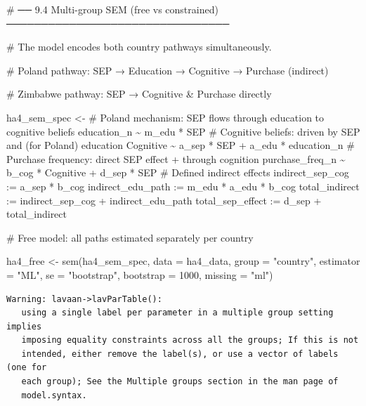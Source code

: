 \documentclass[
  letterpaper,
  DIV=11,
  numbers=noendperiod]{scrartcl}
\newenvironment{Shaded}{\begin{snugshade}}{\end{snugshade}}
\newcommand{\AttributeTok}[1]{\textcolor[rgb]{0.40,0.45,0.13}{#1}}
\newcommand{\CommentTok}[1]{\textcolor[rgb]{0.37,0.37,0.37}{#1}}
\newcommand{\DecValTok}[1]{\textcolor[rgb]{0.68,0.00,0.00}{#1}}
\newcommand{\FunctionTok}[1]{\textcolor[rgb]{0.28,0.35,0.67}{#1}}
\newcommand{\NormalTok}[1]{\textcolor[rgb]{0.00,0.23,0.31}{#1}}
\newcommand{\OtherTok}[1]{\textcolor[rgb]{0.00,0.23,0.31}{#1}}
\newcommand{\StringTok}[1]{\textcolor[rgb]{0.13,0.47,0.30}{#1}}
\begin{document}
\begin{Shaded}
\begin{Highlighting}[]
\CommentTok{\# ── 9.4  Multi{-}group SEM (free vs constrained) ────────────────────────────────}

\CommentTok{\# The model encodes both country pathways simultaneously.}

\CommentTok{\# Poland pathway: SEP → Education → Cognitive → Purchase (indirect)}

\CommentTok{\# Zimbabwe pathway: SEP → Cognitive \& Purchase directly}

\NormalTok{ha4\_sem\_spec }\OtherTok{\textless{}{-}} \StringTok{\textquotesingle{}}
\StringTok{  \# Poland mechanism: SEP flows through education to cognitive beliefs}
\StringTok{  education\_n    \textasciitilde{} m\_edu * SEP}
\StringTok{  \# Cognitive beliefs: driven by SEP and (for Poland) education}
\StringTok{  Cognitive      \textasciitilde{} a\_sep * SEP + a\_edu * education\_n}
\StringTok{  \# Purchase frequency: direct SEP effect + through cognition}
\StringTok{  purchase\_freq\_n \textasciitilde{} b\_cog * Cognitive + d\_sep * SEP}
\StringTok{  \# Defined indirect effects}
\StringTok{  indirect\_sep\_cog  := a\_sep * b\_cog}
\StringTok{  indirect\_edu\_path := m\_edu * a\_edu * b\_cog}
\StringTok{  total\_indirect    := indirect\_sep\_cog + indirect\_edu\_path}
\StringTok{  total\_sep\_effect  := d\_sep + total\_indirect}
\StringTok{\textquotesingle{}}

\CommentTok{\# Free model: all paths estimated separately per country}

\NormalTok{ha4\_free }\OtherTok{\textless{}{-}} \FunctionTok{sem}\NormalTok{(ha4\_sem\_spec, }\AttributeTok{data =}\NormalTok{ ha4\_data, }
                \AttributeTok{group =} \StringTok{"country"}\NormalTok{,}
                \AttributeTok{estimator =} \StringTok{"ML"}\NormalTok{, }
                \AttributeTok{se =} \StringTok{"bootstrap"}\NormalTok{, }\AttributeTok{bootstrap =} \DecValTok{1000}\NormalTok{,}
                \AttributeTok{missing =} \StringTok{"ml"}\NormalTok{)}
\end{Highlighting}
\end{Shaded}

\begin{verbatim}
Warning: lavaan->lavParTable():  
   using a single label per parameter in a multiple group setting implies 
   imposing equality constraints across all the groups; If this is not 
   intended, either remove the label(s), or use a vector of labels (one for 
   each group); See the Multiple groups section in the man page of 
   model.syntax.
\end{verbatim}
\end{document}
